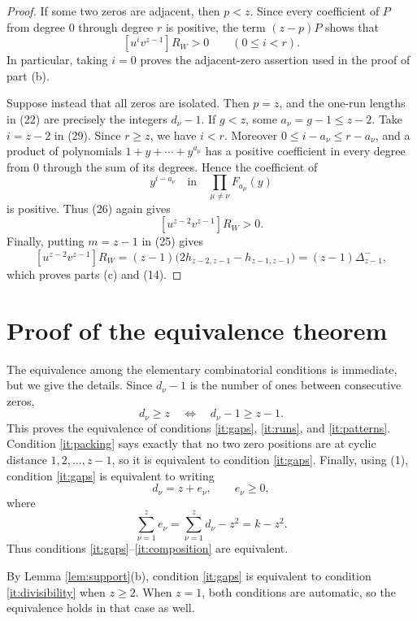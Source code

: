 \documentclass[10pt,a4paper]{article}
\begin{document}
\begin{proof}
If some two zeros are adjacent, then $p<z$.  Since every coefficient of
$P$ from degree $0$ through degree $r$ is positive, the term $(z-p)P$
shows that
\[
                    [u^iv^{z-1}]R_W>0
                    \qquad(0\leq i<r).                       \tag{30}
\]
In particular, taking $i=0$ proves the adjacent-zero assertion used in
the proof of part (b).

Suppose instead that all zeros are isolated.  Then $p=z$, and the
one-run lengths in (22) are precisely the integers $d_\nu-1$.  If
$g<z$, some $a_\nu=g-1\leq z-2$.  Take $i=z-2$ in (29).  Since
$r\geq z$, we have $i<r$.  Moreover
$0\leq i-a_\nu\leq r-a_\nu$, and a product of polynomials
$1+y+\cdots+y^{a_\mu}$ has a positive coefficient in every degree
from $0$ through the sum of its degrees.  Hence the coefficient of
\[
 y^{i-a_\nu}
 \quad\text{in}\quad
 \prod_{\mu\ne\nu}F_{a_\mu}(y)
\]
is positive.  Thus (26) again gives
\[
                    [u^{z-2}v^{z-1}]R_W>0.
\]
Finally, putting $m=z-1$ in (25) gives
\[
 [u^{z-2}v^{z-1}]R_W
    =(z-1)\bigl(2h_{z-2,z-1}-h_{z-1,z-1}\bigr)
    =(z-1)\Delta_{z-1}^-,                                   \tag{31}
\]
which proves parts (c) and (14).
\end{proof}



\section{Proof of the equivalence theorem}

The equivalence among the elementary combinatorial conditions is
immediate, but we give the details.  Since $d_\nu-1$ is the number of
ones between consecutive zeros,
\[
 d_\nu\geq z
 \quad\Longleftrightarrow\quad
 d_\nu-1\geq z-1.                                          \tag{32}
\]
This proves the equivalence of conditions
\ref{it:gaps}, \ref{it:runs}, and \ref{it:patterns}.
Condition \ref{it:packing} says exactly that no two zero positions are
at cyclic distance $1,2,\ldots,z-1$, so it is equivalent to
condition \ref{it:gaps}.  Finally, using (1), condition
\ref{it:gaps} is equivalent to writing
\[
 d_\nu=z+e_\nu,\qquad e_\nu\geq0,
\]
where
\[
 \sum_{\nu=1}^{z}e_\nu
     =\sum_{\nu=1}^{z}d_\nu-z^2=k-z^2.
\]
Thus conditions \ref{it:gaps}--\ref{it:composition} are equivalent.

By Lemma \ref{lem:support}(b), condition \ref{it:gaps} is equivalent
to condition \ref{it:divisibility} when $z\geq2$.  When $z=1$, both
conditions are automatic, so the equivalence holds in that case as
well.
\end{document}
